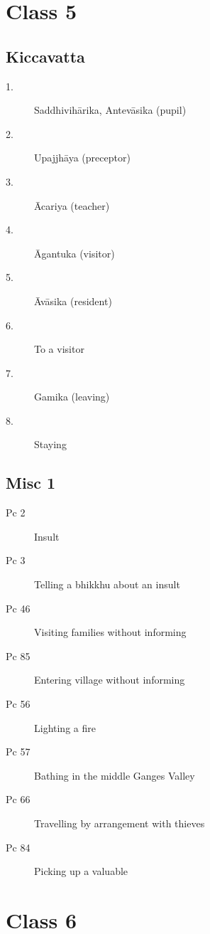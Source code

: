 \documentclass[11pt,oneside]{memoir}
\begin{document}
\chapter{Class 5}

\begin{multicols}{2}

\section{Kiccavatta}

\begin{description}
\item[1.] Saddhivihārika, Antevāsika (pupil)
\item[2.] Upajjhāya (preceptor)
\item[3.] Ācariya (teacher)
\item[4.] Āgantuka (visitor)
\item[5.] Āvāsika (resident)
\item[6.] To a visitor
\item[7.] Gamika (leaving)
\item[8.] Staying
\end{description}

\columnbreak

\section{Misc 1}

\begin{description}
\item[Pc 2] Insult
\item[Pc 3] Telling a bhikkhu about an insult
\item[Pc 46] Visiting families without informing
\item[Pc 85] Entering village without informing
\item[Pc 56 \orig] Lighting a fire%
\item[Pc 57 \orig] Bathing in the middle Ganges Valley%
\item[Pc 66] Travelling by arrangement with thieves
\item[Pc 84 \orig] Picking up a valuable%
\end{description}

\end{multicols}

\chapter{Class 6}
\end{document}

